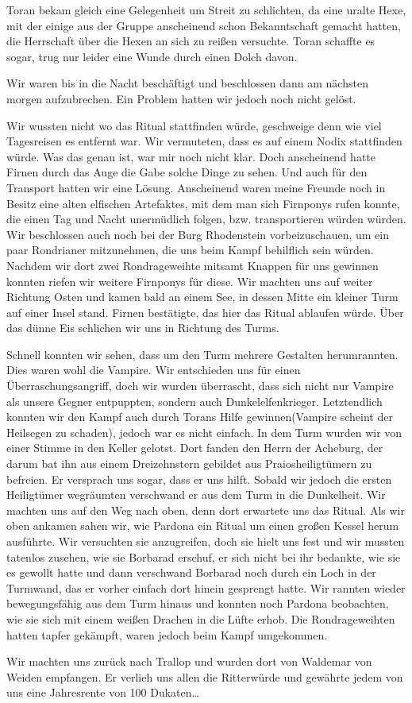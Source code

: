 Toran bekam gleich eine Gelegenheit um Streit zu schlichten, da eine uralte Hexe, mit der einige aus der Gruppe anscheinend schon Bekanntschaft gemacht hatten, die Herrschaft über die Hexen an sich zu reißen versuchte. Toran schaffte es sogar, trug nur leider eine Wunde durch einen Dolch davon.\par
Wir waren bis in die Nacht beschäftigt und beschlossen dann am nächsten morgen aufzubrechen. Ein Problem hatten wir jedoch noch nicht gelöst.\par
Wir wussten nicht wo das Ritual stattfinden würde, geschweige denn wie viel Tagesreisen es entfernt war. Wir vermuteten, dass es auf einem Nodix stattfinden würde. Was das genau ist, war mir noch nicht klar. Doch anscheinend hatte Firnen durch das Auge die Gabe solche Dinge zu sehen. Und auch für den Transport hatten wir eine Lösung. Anscheinend waren meine Freunde noch in Besitz eine alten elfischen Artefaktes, mit dem man sich Firnponys rufen konnte, die einen Tag und Nacht unermüdlich folgen, bzw. transportieren würden würden. Wir beschlossen auch noch bei der Burg Rhodenstein vorbeizuschauen, um ein paar Rondrianer mitzunehmen, die uns beim Kampf behilflich sein würden. Nachdem wir dort zwei Rondrageweihte mitsamt Knappen für uns gewinnen konnten riefen wir weitere Firnponys für diese. Wir machten uns auf weiter Richtung Osten und kamen bald an einem See, in dessen Mitte ein kleiner Turm auf einer Insel stand. Firnen bestätigte, das hier das Ritual ablaufen würde. Über das dünne Eis schlichen wir uns in Richtung des Turms. \par

Schnell konnten wir sehen, dass um den Turm mehrere Gestalten herumrannten. Dies waren wohl die Vampire. Wir entschieden uns für einen Überraschungsangriff, doch wir wurden überrascht, dass sich nicht nur Vampire als unsere Gegner entpuppten, sondern auch Dunkelelfenkrieger. Letztendlich konnten wir den Kampf auch durch Torans Hilfe gewinnen(Vampire scheint der Heilsegen zu schaden), jedoch war es nicht einfach. In dem Turm wurden wir von einer Stimme in den Keller gelotst. Dort fanden den Herrn der Acheburg, der darum bat ihn aus einem Dreizehnstern gebildet aus Praiosheiligtümern zu befreien. Er versprach uns sogar, dass er uns hilft. Sobald wir jedoch die ersten Heiligtümer wegräumten verschwand er aus dem Turm in die Dunkelheit. Wir machten uns auf den Weg nach oben, denn dort erwartete uns das Ritual. Als wir oben ankamen sahen wir, wie Pardona ein Ritual um einen großen Kessel herum ausführte. Wir versuchten sie anzugreifen, doch sie hielt uns fest und wir mussten tatenlos zusehen, wie sie Borbarad erschuf, er sich nicht bei ihr bedankte, wie sie es gewollt hatte und dann verschwand Borbarad noch durch ein Loch in der Turmwand, das er vorher einfach dort hinein gesprengt hatte. Wir rannten wieder bewegungsfähig aus dem Turm hinaus und konnten noch Pardona beobachten, wie sie sich mit einem weißen Drachen in die Lüfte erhob. Die Rondrageweihten hatten tapfer gekämpft, waren jedoch beim Kampf umgekommen.\par
Wir machten uns zurück nach Trallop und wurden dort von Waldemar von Weiden empfangen. Er verlieh uns allen die Ritterwürde und gewährte jedem von uns eine Jahresrente von 100 Dukaten\dots 

